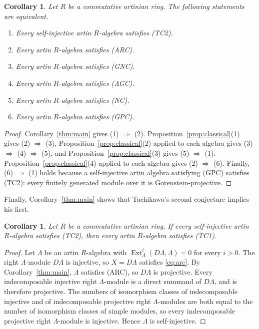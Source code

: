 \documentclass[a4paper,reqno,10pt]{amsart}
\newtheorem{corollary}[theorem]{Corollary}
\theoremstyle{definition}
\numberwithin{equation}{section}
\newcommand{\Ext}{\operatorname{Ext}}
\newcommand{\ARC}{\textup{(ARC)}}
\newcommand{\GNC}{\textup{(GNC)}}
\newcommand{\AGC}{\textup{(AGC)}}
\newcommand{\NC}{\textup{(NC)}}
\newcommand{\TCone}{\textup{(TC1)}}
\newcommand{\TCtwo}{\textup{(TC2)}}
\newcommand{\GPC}{\textup{(GPC)}}
\begin{document}
\begin{corollary}\label{cor:equivalences}
Let $R$ be a commutative artinian ring.  The following statements are
equivalent.
\begin{enumerate}
\item Every self-injective artin $R$-algebra satisfies \TCtwo.
\item Every artin $R$-algebra satisfies \ARC.
\item Every artin $R$-algebra satisfies \GNC.
\item Every artin $R$-algebra satisfies \AGC.
\item Every artin $R$-algebra satisfies \NC.
\item Every artin $R$-algebra satisfies \GPC.
\end{enumerate}
\end{corollary}

\begin{proof}
Corollary~\ref{thm:main} gives (1) $\Rightarrow$ (2).
Proposition~\ref{prop:classical}(1) gives (2) $\Rightarrow$ (3),
Proposition~\ref{prop:classical}(2) applied to each algebra gives
(3) $\Rightarrow$ (4) $\Rightarrow$ (5), and
Proposition~\ref{prop:classical}(3) gives (5) $\Rightarrow$ (1).
Proposition~\ref{prop:classical}(4) applied to each algebra gives
(2) $\Rightarrow$ (6).  Finally, (6) $\Rightarrow$ (1) holds because a self-injective artin algebra
satisfying \GPC{} satisfies \TCtwo: every finitely generated module over it
is Gorenstein-projective.
\end{proof}

Finally, Corollary~\ref{thm:main} shows that Tachikawa's second conjecture
implies his first.

\begin{corollary}\label{cor:tc1}
Let $R$ be a commutative artinian ring.  If every self-injective artin
$R$-algebra satisfies \TCtwo, then every artin $R$-algebra satisfies \TCone.
\end{corollary}

\begin{proof}
Let $\Lambda$ be an artin $R$-algebra with $\Ext_\Lambda^i(D\Lambda,\Lambda)=0$
for every $i>0$.  The right $\Lambda$-module $D\Lambda$ is injective, so
$X=D\Lambda$ satisfies \eqref{eq:arc}.  By Corollary~\ref{thm:main}, $\Lambda$
satisfies \ARC, so $D\Lambda$ is projective.  Every indecomposable injective
right $\Lambda$-module is a direct summand of $D\Lambda$, and is therefore
projective.  The numbers of isomorphism classes of indecomposable injective
and of indecomposable projective right $\Lambda$-modules are both equal to
the number of isomorphism classes of simple modules, so every indecomposable
projective right $\Lambda$-module is injective.  Hence $\Lambda$ is
self-injective.
\end{proof}
\end{document}
